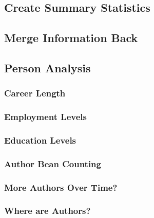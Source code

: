 \documentclass[
  english,
  man]{apa6}
\begin{document}
\hypertarget{create-summary-statistics}{%
\subsection{Create Summary Statistics}\label{create-summary-statistics}}

\hypertarget{merge-information-back}{%
\subsection{Merge Information Back}\label{merge-information-back}}

\hypertarget{person-analysis}{%
\subsection{Person Analysis}\label{person-analysis}}

\hypertarget{career-length}{%
\subsubsection{Career Length}\label{career-length}}

\hypertarget{employment-levels}{%
\subsubsection{Employment Levels}\label{employment-levels}}

\hypertarget{education-levels}{%
\subsubsection{Education Levels}\label{education-levels}}

\hypertarget{author-bean-counting}{%
\subsubsection{Author Bean Counting}\label{author-bean-counting}}

\hypertarget{more-authors-over-time}{%
\subsubsection{More Authors Over Time?}\label{more-authors-over-time}}

\hypertarget{where-are-authors}{%
\subsubsection{Where are Authors?}\label{where-are-authors}}
\end{document}

